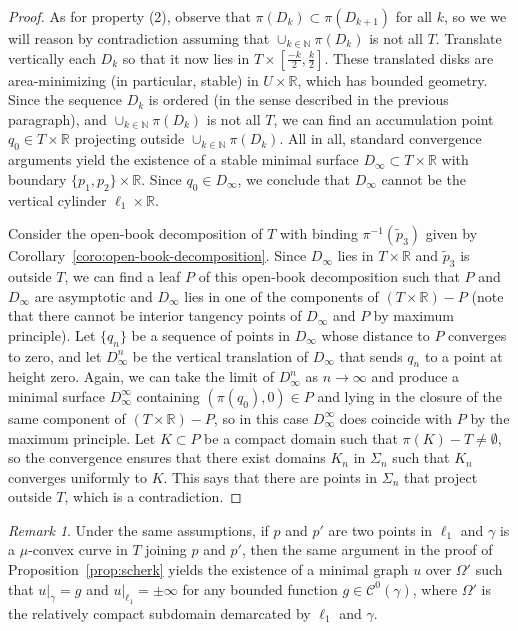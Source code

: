 \documentclass[a4paper,10pt,reqno]{amsart}
\newcommand{\N}{\mathbb{N}}
\newcommand{\R}{\mathbb{R}}
\newcommand{\sm}{-}
\theoremstyle{definition}
\theoremstyle{remark}
\newtheorem{remark}[theorem]{Remark}
\numberwithin{equation}{section}
\begin{document}
\begin{proof}
As for property (2), observe that $\pi(D_k)\subset\pi(D_{k+1})$ for all $k$, so we we will reason by contradiction assuming that $\cup_{k\in\N}\pi(D_k)$ is not all $T$. Translate vertically each $D_k$ so that it now lies in $T\times[\frac{-k}{2},\frac{k}{2}]$. These translated disks are area-minimizing (in particular, stable) in $U\times\R$, which has bounded geometry. Since the sequence $D_k$ is ordered (in the sense described in the previous paragraph), and $\cup_{k\in\N}\pi(D_k)$ is not all $T$, we can find an accumulation point $q_0\in T\times\R$ projecting outside $\cup_{k\in\N}\pi(D_k)$. All in all, standard convergence arguments yield the existence of a stable minimal surface $D_\infty\subset T\times\R$ with boundary $\{p_1,p_2\}\times\R$. Since $q_0\in D_{\infty}$, we conclude that $D_\infty$ cannot be the vertical cylinder $\ell_1\times\R$.

Consider the open-book decomposition of $T$ with binding $\pi^{-1}(\tilde{p}_3)$ given by Corollary~\ref{coro:open-book-decomposition}. Since $D_\infty$ lies in $T\times\R$ and $\tilde{p}_3$ is outside $T$, we can find a leaf $P$ of this open-book decomposition such that $P$ and $D_\infty$ are asymptotic and $D_\infty$ lies in one of the components of $(T\times\R)\sm P$ (note that there cannot be interior tangency points of $D_\infty$ and $P$ by maximum principle). Let $\{q_n\}$ be a sequence of points in $D_\infty$ whose distance to $P$ converges to zero, and let $D_\infty^n$ be the vertical translation of $D_\infty$ that sends $q_n$ to a point at height zero. Again, we can take the limit of $D_\infty^n$ as $n\to\infty$ and produce a minimal surface $D_\infty^\infty$ containing $(\pi(q_0),0)\in P$ and lying in the closure of the same component of $(T\times\R)\sm P$, so in this case $D_\infty^\infty$ does coincide with $P$ by the maximum principle. Let $K\subset P$ be a compact domain such that $\pi(K)\sm T\neq\emptyset$, so the convergence ensures that there exist domains $K_n$ in $\Sigma_n$ such that $K_n$ converges uniformly to $K$. This says that there are points in $\Sigma_n$ that project outside $T$, which is a contradiction. 
\end{proof}
	
\begin{remark}
Under the same assumptions, if $p$ and $p'$ are two points in $\ell_1$ and $\gamma$ is a $\mu$-convex curve in $T$ joining $p$ and $p'$, then the same argument in the proof of Proposition~\ref{prop:scherk} yields the existence of a minimal graph $u$ over $\Omega'$ such that $u|_\gamma=g$ and $u|_{\ell_1}=\pm\infty$ for any bounded function $g\in\mathcal{C}^0(\gamma)$, where $\Omega'$ is the relatively compact subdomain demarcated by $\ell_1$ and $\gamma$.
\end{remark}
\end{document}
